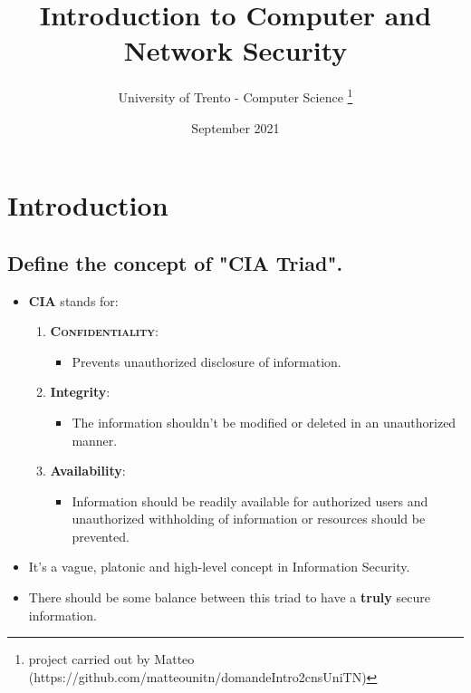 \documentclass[9pt, letterpaper]{article}
\title{Introduction to Computer and Network Security}
\author{University of Trento - Computer Science \thanks{project carried out by Matteo (https://github.com/matteounitn/domandeIntro2cnsUniTN)}}
\date{September 2021}
\begin{document}
\graphicspath{ {img/} }
\begin{titlepage}
	\maketitle
	\tableofcontents
\end{titlepage}

\section{Introduction}

\subsection{Define the concept of "CIA Triad".}
\begin{itemize}
	\item \textbf{CIA} stands for: 
	\begin{enumerate}
		\item \textbf{\textsc{Confidentiality}}: 
		\begin{itemize}
			\item Prevents unauthorized disclosure of information.
		\end{itemize}				
		\item \textbf{Integrity}:
		\begin{itemize}
			\item The information shouldn't be modified or deleted in an unauthorized manner.
		\end{itemize}
		\item \textbf{Availability}:
		\begin{itemize}
			\item Information should be readily available for authorized users and unauthorized withholding of information or resources should be prevented.
		\end{itemize}
	\end{enumerate}
	\item It's a vague, platonic and high-level concept in Information Security. 
	\item 	There should be some balance between this triad to have a \textbf{truly} secure information.
\end{itemize}
\end{document}
